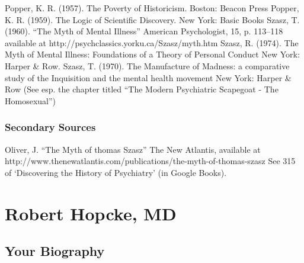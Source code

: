 Popper, K. R. (1957). The Poverty of Historicism. Boston: Beacon Press
Popper, K. R. (1959). The Logic of Scientific Discovery. New York: Basic Books
Szasz, T. (1960). “The Myth of Mental Illness” American Psychologist, 15, p. 113--118 available at http:\slash \slash psychclassics.yorku.ca\slash Szasz\slash myth.htm
Szasz, R. (1974). The Myth of Mental Illness: Foundations of a Theory of Personal Conduct New York: Harper \& Row.
Szasz, T. (1970). The Manufacture of Madness: a comparative study of the Inquisition and the mental health movement New York: Harper \& Row (See esp. the chapter titled “The Modern Psychiatric Scapegoat - The Homosexual”)

\subsection{Secondary Sources}
\label{secondarysources}

Oliver, J. “The Myth of thomas Szasz” The New Atlantis, available at http:\slash \slash www.thenewatlantis.com\slash publications\slash the-myth-of-thomas-szasz
See 315 of `Discovering the History of Psychiatry' (in Google Books).

\chapter{Robert Hopcke, MD}
\label{roberthopckemd}

\section{Your Biography}
\label{yourbiography}

